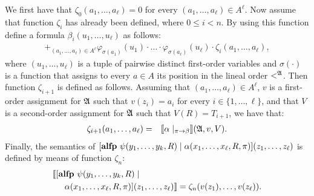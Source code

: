 We first have that $\zeta_0(a_1, \ldots, a_\ell) = 0$ for every $(a_1, \ldots, a_\ell) \in A^\ell$. Now assume that function $\zeta_i$ has already been defined, where $0 \leq i < n$. By using this function define a formula $\beta_{i}(u_1, \ldots, u_\ell)$ as follows:
\begin{multline*}
 \mathop{+}_{(a_1,\ldots,a_{\ell})\in A^{\ell}} \varphi_{\sigma(a_1)}(u_1) \cdot \ldots \cdot \varphi_{\sigma(a_{\ell})}(u_{\ell})\cdot \zeta_{i}(a_1,\ldots,a_{\ell}), 
\end{multline*}
where $(u_1, \ldots, u_\ell)$ is a tuple of pairwise distinct first-order variables and $\sigma(\cdot)$ is a function that assigns to every $a \in A$ its position in the lineal order $<^{\mathfrak{A}}$. 
Then function $\zeta_{i+1}$ is defined as follows. Assuming that $(a_1, \ldots, a_\ell) \in A^\ell$, $v$ is a first-order assignment for $\mathfrak{A}$ such that $v(z_i) = a_i$ for every $i \in \{1, \ldots, \ell\}$, and that $V$ is a second-order assignment for $\mathfrak{A}$ such that $V(R) = T_{i+1}$, we have that:
\begin{eqnarray*}
\zeta_{i+1}(a_1, \ldots, a_\ell) & = & {\llbracket{}{\alpha\mid_{\pi \to \beta}}\rrbracket}(\mathfrak{A},v,V).
\end{eqnarray*}
Finally, the semantics of $[{\bf alfp} \,\,\psi(y_1,\ldots,y_k,R)\mid\alpha(x_1,\ldots,x_{\ell},R,\pi)](z_1,\ldots,z_{\ell})$ is defined by means of function $\zeta_n$:
\begin{align*}
&\llbracket [{\bf alfp} \,\,\psi(y_1,\ldots,y_k,R)\mid\\
&\hspace{5mm}\alpha(x_1,\ldots,x_{\ell},R,\pi)](z_1,\ldots,z_{\ell}) \rrbracket =
\zeta_n(v(z_1),\ldots,v(z_{\ell})).
\end{align*}


